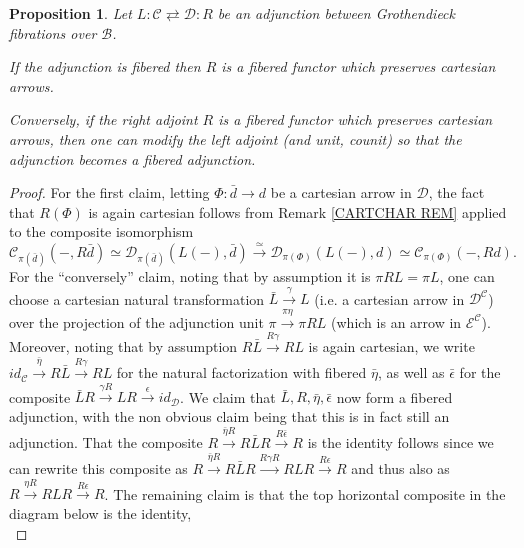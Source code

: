 \documentclass[a4paper,10pt
]{article}%
\numberwithin{equation}{section}
\numberwithin{figure}{section}
\newtheorem{proposition}[equation]{Proposition}%
\theoremstyle{definition} %
\newcommand{\1}{\ensuremath{\mathbbm 1}}%
\begin{document}
\begin{proposition}\label{FIBADJCAR PROP}
	Let $L \colon \mathcal{C} \rightleftarrows \mathcal{D} \colon R$
	be an adjunction between Grothendieck fibrations
	over $\mathcal{B}$.
	
	If the adjunction is fibered then 
	$R$ is 
	a fibered functor which preserves cartesian arrows.
	
	Conversely, if the right adjoint $R$ is 
	a fibered functor which preserves cartesian arrows, 
	then one can modify the left adjoint (and unit, counit)
	so that the adjunction becomes a fibered adjunction.
\end{proposition}


\begin{proof}
	For the first claim, 
	letting $\Phi \colon \bar{d} \to d$ be a cartesian arrow
	in $\mathcal{D}$, 
	the fact that $R(\Phi)$ is again cartesian follows from
	Remark \ref{CARTCHAR REM} applied to the composite isomorphism
	\[
	\mathcal{C}_{\pi(\bar{d})}
	\left(-,R\bar{d}\right)
	\simeq 
	\mathcal{D}_{\pi(\bar{d})}
	\left(L(-),\bar{d}\right)
	\xrightarrow{\simeq}
	\mathcal{D}_{\pi(\Phi)}\left(L(-),d\right)
	\simeq
	\mathcal{C}_{\pi(\Phi)}\left(-,Rd\right).
	\]
	For the ``conversely'' claim,
	noting that by assumption it is $\pi RL = \pi L$,
	one can choose a cartesian natural transformation 
	$\bar{L} \xrightarrow{\gamma} L$
	(i.e. a cartesian arrow in $\mathcal{D}^{\mathcal{C}}$)
	over the projection of the adjunction unit
	$\pi \xrightarrow{\pi \eta} \pi RL$
	(which is an arrow in $\mathcal{E}^{\mathcal{C}}$).
	Moreover, noting that by assumption
	$R\bar{L} \xrightarrow{R \gamma} RL$ is again cartesian,
	we write
	$id_{\mathcal{C}} \xrightarrow{\bar{\eta}} 
	R \bar{L} \xrightarrow{R \gamma} RL$
	for the natural factorization
	with fibered $\bar{\eta}$,
	as well as $\bar{\epsilon}$ for the composite
	$\bar{L}R \xrightarrow{\gamma R} 
	LR \xrightarrow{\epsilon} id_{\mathcal{D}}$.
	We claim that $\bar{L},R,\bar{\eta},\bar{\epsilon}$
	now form a fibered adjunction, with the non obvious claim being that this is in fact still an adjunction.
	That the composite
	$R\xrightarrow{\bar{\eta}R} R\bar{L}R \xrightarrow{R\bar{\epsilon}} R$
	is the identity follows since
        we can rewrite this composite as
	$R \xrightarrow{\bar{\eta} R} R\bar{L}R 
	\xrightarrow{R \gamma R} RLR \xrightarrow{R \epsilon} R$ 
	and thus also as
        $R \xrightarrow{\eta R} RLR \xrightarrow{R \epsilon} R$.
	The remaining claim is that the top horizontal composite in the diagram below is the identity, 
	\begin{equation}

\end{equation}
\end{proof}
\end{document}
